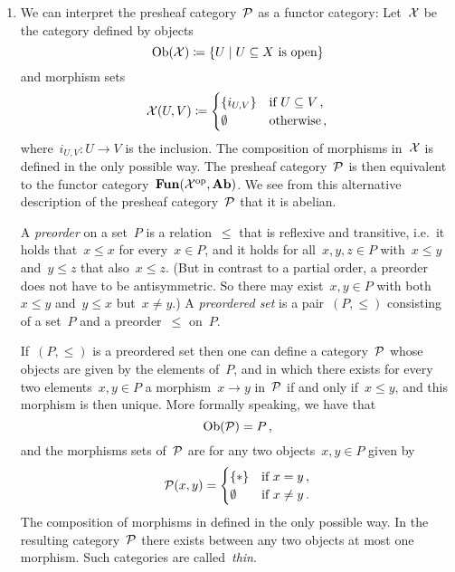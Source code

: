 \begin{example}
\begin{enumerate}
    \item
      We can interpret the presheaf category~$\mathcal{P}$ as a functor category:
      Let~$\mathcal{X}$ be the category defined by objects
      \[
                  \Ob(\Xcat)
        \defined  \{
                    U
                  \suchthat
                    \text{$U \subseteq X$ is open}
                  \}
      \]
      and morphism sets
      \[
                  \mathcal{X}(U,V)
        \coloneqq  \begin{cases}
                    \{ i_{U,V} \} & \text{if~$U \subseteq V$} \,, \\
                    \emptyset     & \text{otherwise} \,,
                  \end{cases}
      \]
      where~$i_{U,V} \colon U \to V$ is the inclusion.
      The composition of morphisms in~$\mathcal{X}$ is defined in the only possible way.
      The presheaf category~$\mathcal{P}$ is then equivalent to the functor category~$\mathbf{Fun}(\mathcal{X}^{\mathrm{op}}, \mathbf{Ab})$.
      We see from this alternative description of the presheaf category~$\mathcal{P}$ that it is abelian.
      
      \begin{remark*}
        A \emph{preorder} on a set~$P$ is a relation~$\leq$ that is reflexive and transitive, i.e.\ it holds that~$x \leq x$ for every~$x \in P$, and it holds for all~$x, y, z \in P$ with~$x \leq y$ and~$y \leq z$ that also~$x \leq z$.
        (But in contrast to a partial order, a preorder does not have to be antisymmetric.
        So there may exist~$x, y \in P$ with both~$x \leq y$ and~$y \leq x$ but~$x \neq y$.)
        A \emph{preordered set} is a pair~$(P,\leq)$ consisting of a set~$P$ and a preorder~$\leq$ on~$P$.
        
        If~$(P,\leq)$ is a preordered set then one can define a category~$\mathcal{P}$ whose objects are given by the elements of~$P$, and in which there exists for every two elements~$x, y \in P$ a morphism~$x \to y$ in~$\mathcal{P}$ if and only if~$x \leq y$, and this morphism is then unique.
        More formally speaking, we have that
        \[
            \operatorname{Ob}(\mathcal{P})
          = P \,,
        \]
        and the morphisms sets of~$\mathcal{P}$ are for any two objects~$x, y \in P$ given by
        \[
            \mathcal{P}(x,y)
          = \begin{cases}
              \{\ast\}  & \text{if~$x = y$} \,, \\
              \emptyset & \text{if~$x \neq y$}  \,.
            \end{cases}
        \]
        The composition of morphisms in defined in the only possible way.
        In the resulting category~$\mathcal{P}$ there exists between any two objects at most one morphism.
        Such categories are called~\emph{thin}.
        

\end{remark*}
\end{enumerate}
\end{example}
